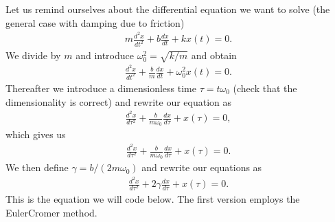 \documentclass[letterpaper,10pt,english]{sphinxmanual}
\begin{document}
Let us remind ourselves about the differential equation we want to solve (the general case with damping due to friction)
\begin{equation*}
\begin{split}
m\frac{d^2x}{dt^2} + b\frac{dx}{dt}+kx(t) =0.
\end{split}
\end{equation*}
We divide by \(m\) and introduce \(\omega_0^2=\sqrt{k/m}\) and obtain
\begin{equation*}
\begin{split}
\frac{d^2x}{dt^2} + \frac{b}{m}\frac{dx}{dt}+\omega_0^2x(t) =0.
\end{split}
\end{equation*}
Thereafter we introduce a dimensionless time \(\tau = t\omega_0\) (check
that the dimensionality is correct) and rewrite our equation as
\begin{equation*}
\begin{split}
\frac{d^2x}{d\tau^2} + \frac{b}{m\omega_0}\frac{dx}{d\tau}+x(\tau) =0,
\end{split}
\end{equation*}
which gives us
\begin{equation*}
\begin{split}
\frac{d^2x}{d\tau^2} + \frac{b}{m\omega_0}\frac{dx}{d\tau}+x(\tau) =0.
\end{split}
\end{equation*}
We then define \(\gamma = b/(2m\omega_0)\) and rewrite our equations as
\begin{equation*}
\begin{split}
\frac{d^2x}{d\tau^2} + 2\gamma\frac{dx}{d\tau}+x(\tau) =0.
\end{split}
\end{equation*}
This is the equation we will code below. The first version employs the Euler\sphinxhyphen{}Cromer method.
\end{document}
